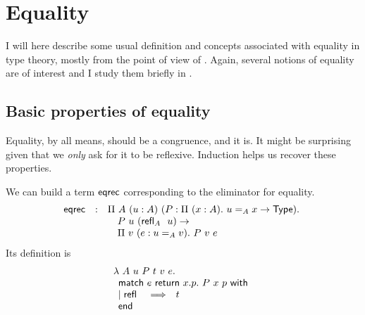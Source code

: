 \section{Equality}

I will here describe some usual definition and concepts associated with equality
in type theory, mostly from the point of view of \Coq.
Again, several notions of equality are of interest and I study them briefly
in .

\subsection{Basic properties of equality}

Equality, by all means, should be a congruence, and it is. It might be
surprising given that we \emph{only} ask for it to be reflexive.
Induction helps us recover these properties.

We can build a term \(\mathsf{eqrec}\) corresponding to the eliminator for equality.
\[
  \begin{array}{lcl}
    \mathsf{eqrec} &:&
    \Pi\ A\ (u : A)\ (P : \Pi\ (x : A).\ u =_A x \to \mathsf{Type}).\ \\
    && \quad P\ u\ ({\mathsf{refl}}_{A}\ \ u) \to \\
    && \quad \Pi\ v\ (e : u =_A v).\ P\ v\ e
  \end{array}
\]
Its definition is
\[
  \begin{array}{l}
    \lambda\ A\ u\ P\ t\ v\ e.\ \\
    \pmatch{e}{x.p.\ P\ x\ p}{
      \branch{\refl{}}{t}
    }
  \end{array}
\]

